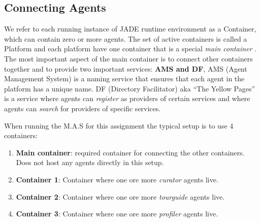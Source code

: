 \documentclass[a4paper, 11pt]{article}
\begin{document}
\subsection*{Connecting Agents}
We refer to each running instance of JADE runtime environment as a Container, which can contain zero or more agents. The set of active containers is called a Platform and each platform have one container that is a special \textit{main container} \citep{jade_tutorial}. The most important aspect of the main container is to connect other containers together and to provide two important services: \textbf{AMS and DF}, AMS (Agent Management System) is a naming service that ensures that each agent in the platform has a unique name. DF (Directory Facilitator) aka ``The Yellow Pages'' is a service where agents can \textit{register} as providers of certain services and where agents can \textit{search} for providers of specific services. 

When running the M.A.S for this assignment the typical setup is to use $4$ containers:
\begin{enumerate}[I]
\item \textbf{Main container}: required container for connecting the other containers. Does not host any agents directly in this setup.
\item \textbf{Container 1}: Container where one ore more \textit{curator} agents live.
\item \textbf{Container 2}: Container where one ore more \textit{tourguide} agents live.
\item \textbf{Container 3}: Container where one ore more \textit{profiler} agents live.
\end{enumerate}
\end{document}

